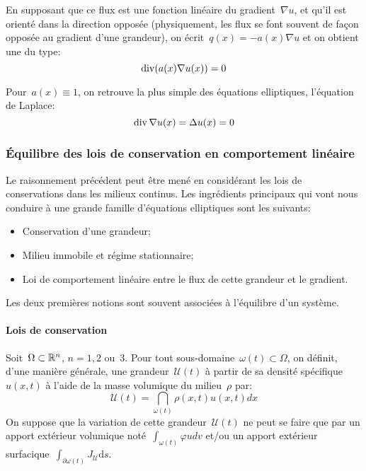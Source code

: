 En supposant que ce flux est une fonction linéaire du gradient~$\nabla u$, et qu'il est orienté 
dans la direction opposée (physiquement, les flux se font souvent de façon opposée au gradient 
d'une grandeur), on écrit~$q(x) = -a(x)\nabla u$ et on obtient une  du type:
\begin{equation}\operatorname{div}(a(x)\nabla u(x)) = 0\end{equation}

Pour~$a(x) \equiv 1$, on retrouve la plus simple des équations elliptiques, l'équation de Laplace:
\begin{equation}\operatorname{div}\nabla u(x) = \Delta u(x) = 0\end{equation}

\medskip
\subsubsection{Équilibre des lois de conservation en comportement linéaire}
Le raisonnement précédent peut être mené en considérant les lois de conservations 
dans les milieux continus. Les ingrédients principaux qui vont nous conduire à une grande famille 
d'équations elliptiques sont les suivants:
\begin{itemize}
  \item Conservation d'une grandeur;
  \item Milieu immobile et régime stationnaire;
  \item Loi de comportement linéaire entre le flux de cette grandeur et le gradient.
\end{itemize}
Les deux premières notions sont souvent associées à l'équilibre d'un système.

\medskip
\paragraph{Lois de conservation}
Soit~$\Omega\subset\mathbb R^n$, $n=1, 2$ ou~$3$.
Pour tout sous-domaine~$\omega(t)\subset\Omega$, on définit, d'une manière 
générale, une grandeur~$\mathcal{U}(t)$ à partir de sa densité spécifique
$u(x,t)$ à l'aide de la masse volumique du milieu~$\rho$ par:
\begin{equation}\mathcal{U}(t)=\dint_{\omega(t)} \rho(x,t)u(x,t)dx\end{equation}
On suppose que la variation de cette grandeur~$\mathcal{U}(t)$ ne peut se faire
que par un apport extérieur volumique noté~$\int_{\omega(t)} \varphi u dv$
et/ou un apport extérieur surfacique~$\int_{\partial\omega(t)} J_{\mathcal{U}} \mathrm ds$.

